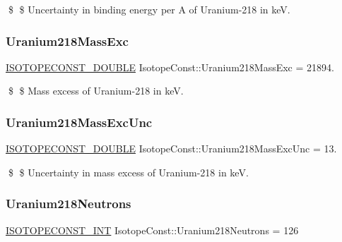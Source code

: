 \$ \$ Uncertainty in binding energy per A of Uranium-\/218 in keV. \mbox{\label{group___isotope_const-_uranium-_u218_gae99781c80399620450db2ab08f41fa27}} 
\subsubsection{\texorpdfstring{Uranium218\+Mass\+Exc}{Uranium218MassExc}}
{\footnotesize\ttfamily \mbox{\hyperlink{group___isotope_const-_macros_ga8f45a7272ce02c0b4c65c44636ed719a}{I\+S\+O\+T\+O\+P\+E\+C\+O\+N\+S\+T\+\_\+\+D\+O\+U\+B\+LE}} Isotope\+Const\+::\+Uranium218\+Mass\+Exc = 21894.}

\$ \$ Mass excess of Uranium-\/218 in keV. \mbox{\label{group___isotope_const-_uranium-_u218_ga62bb86fedd813e6c1f64a3d2b3c48978}} 
\subsubsection{\texorpdfstring{Uranium218\+Mass\+Exc\+Unc}{Uranium218MassExcUnc}}
{\footnotesize\ttfamily \mbox{\hyperlink{group___isotope_const-_macros_ga8f45a7272ce02c0b4c65c44636ed719a}{I\+S\+O\+T\+O\+P\+E\+C\+O\+N\+S\+T\+\_\+\+D\+O\+U\+B\+LE}} Isotope\+Const\+::\+Uranium218\+Mass\+Exc\+Unc = 13.}

\$ \$ Uncertainty in mass excess of Uranium-\/218 in keV. \mbox{\label{group___isotope_const-_uranium-_u218_ga6d4c02350fec00dac381c9fa12f9cfb4}} 
\subsubsection{\texorpdfstring{Uranium218\+Neutrons}{Uranium218Neutrons}}
{\footnotesize\ttfamily \mbox{\hyperlink{group___isotope_const-_macros_ga5f18360b3e99483a35c32d789e62621c}{I\+S\+O\+T\+O\+P\+E\+C\+O\+N\+S\+T\+\_\+\+I\+NT}} Isotope\+Const\+::\+Uranium218\+Neutrons = 126}

